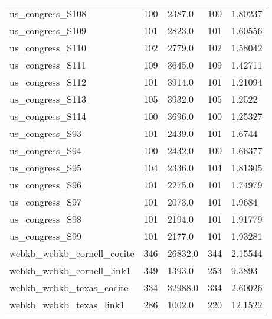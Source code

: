 \begin{longtable}{lllll}
 us\_congress\_S108                                   & 100        & 2387.0      & 100   & 1.80237    \\
 us\_congress\_S109                                   & 101        & 2823.0      & 101   & 1.60556    \\
 us\_congress\_S110                                   & 102        & 2779.0      & 102   & 1.58042    \\
 us\_congress\_S111                                   & 109        & 3645.0      & 109   & 1.42711    \\
 us\_congress\_S112                                   & 101        & 3914.0      & 101   & 1.21094    \\
 us\_congress\_S113                                   & 105        & 3932.0      & 105   & 1.2522     \\
 us\_congress\_S114                                   & 100        & 3696.0      & 100   & 1.25327    \\
 us\_congress\_S93                                    & 101        & 2439.0      & 101   & 1.6744     \\
 us\_congress\_S94                                    & 100        & 2432.0      & 100   & 1.66377    \\
 us\_congress\_S95                                    & 104        & 2336.0      & 104   & 1.81305    \\
 us\_congress\_S96                                    & 101        & 2275.0      & 101   & 1.74979    \\
 us\_congress\_S97                                    & 101        & 2073.0      & 101   & 1.9684     \\
 us\_congress\_S98                                    & 101        & 2194.0      & 101   & 1.91779    \\
 us\_congress\_S99                                    & 101        & 2177.0      & 101   & 1.93281    \\
 webkb\_webkb\_cornell\_cocite                         & 346        & 26832.0     & 344   & 2.15544    \\
 webkb\_webkb\_cornell\_link1                          & 349        & 1393.0      & 253   & 9.3893     \\
 webkb\_webkb\_texas\_cocite                           & 334        & 32988.0     & 334   & 2.60026    \\
 webkb\_webkb\_texas\_link1                            & 286        & 1002.0      & 220   & 12.1522    \\

\end{longtable}
